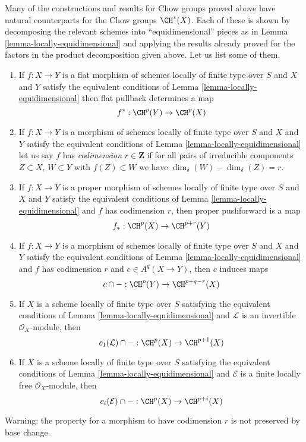 \medskip\noindent
Many of the constructions and results for Chow groups proved above have
natural counterparts for the Chow groups $\CH^*(X)$. Each of these is
shown by decomposing the relevant schemes into ``equidimensional'' pieces
as in Lemma \ref{lemma-locally-equidimensional}
and applying the results already proved for the
factors in the product decomposition given above.
Let us list some of them.
\begin{enumerate}
\item If $f : X \to Y$ is a flat morphism of schemes locally of finite type
over $S$ and $X$ and $Y$ satisfy the equivalent conditions of
Lemma \ref{lemma-locally-equidimensional} then flat pullback determines a map
$$
f^* : \CH^p(Y) \to \CH^p(X)
$$
\item If $f : X \to Y$ is a morphism of schemes locally of finite type
over $S$ and $X$ and $Y$ satisfy the equivalent conditions of
Lemma \ref{lemma-locally-equidimensional} let us say $f$ has
{\it codimension} $r \in \mathbf{Z}$ if for all pairs of irreducible components
$Z \subset X$, $W \subset Y$ with $f(Z) \subset W$ we have
$\dim_\delta(W) - \dim_\delta(Z) = r$.
\item If $f : X \to Y$ is a proper morphism of schemes locally of finite type
over $S$ and $X$ and $Y$ satisfy the equivalent conditions of
Lemma \ref{lemma-locally-equidimensional} and $f$ has codimension $r$,
then proper pushforward is a map
$$
f_* : \CH^p(X) \to \CH^{p + r}(Y)
$$
\item If $f : X \to Y$ is a morphism of schemes locally of finite type over $S$
and $X$ and $Y$ satisfy the equivalent conditions of
Lemma \ref{lemma-locally-equidimensional} and $f$ has codimension $r$
and $c \in A^q(X \to Y)$, then $c$ induces maps
$$
c \cap -  : \CH^p(Y) \to \CH^{p + q - r}(X)
$$
\item If $X$ is a scheme locally of finite type over $S$
satisfying the equivalent conditions of
Lemma \ref{lemma-locally-equidimensional} and
$\mathcal{L}$ is an invertible $\mathcal{O}_X$-module,
then
$$
c_1(\mathcal{L}) \cap - : \CH^p(X) \to \CH^{p + 1}(X)
$$
\item If $X$ is a scheme locally of finite type over $S$
satisfying the equivalent conditions of
Lemma \ref{lemma-locally-equidimensional} and
$\mathcal{E}$ is a finite locally free $\mathcal{O}_X$-module,
then
$$
c_i(\mathcal{E}) \cap - : \CH^p(X) \to \CH^{p + i}(X)
$$
\end{enumerate}
Warning: the property for a morphism to have codimension $r$
is not preserved by base change.

